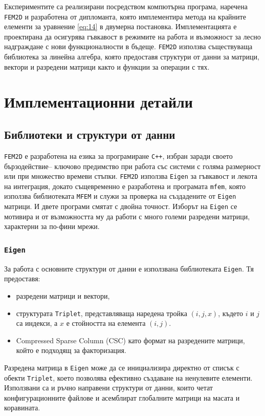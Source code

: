 \documentclass{report}
\begin{document}
	Експериментите са реализирани посредством компютърна програма, наречена \texttt{FEM2D} и разработена от дипломанта, която имплементира метода на крайните елементи за уравнение \eqref{eq:14} в двумерна постановка. Имплементацията е проектирана да осигурява гъвкавост в режимите на работа и възможност за лесно надграждане с нови функционалности в бъдеще. \texttt{FEM2D} използва съществуваща библиотека за линейна алгебра, която предоставя структури от данни за матрици, вектори и разредени матрици както и функции за операции с тях.
	
	
	\section{Имплементационни детайли}
	\subsection{Библиотеки и структури от данни}\label{subsec:libraries}
	\texttt{FEM2D} е разработена на езика за програмиране \texttt{C++}, избран заради своето бързодействие– ключово предимство при работа със системи с голяма размерност или при множество времеви стъпки. \texttt{FEM2D} използва \texttt{Eigen} \cite{eigenweb} за гъвкавост и лекота на интеграция, докато същевременно е разработена и програмата \texttt{mfem}, която използва библиотеката \texttt{MFEM} \cite{mfem2021} и служи за проверка на създадените от \texttt{Eigen} матрици. И двете програми смятат с двойна точност. Изборът на \texttt{Eigen} се мотивира и от възможността му да работи с много големи разредени матрици, характерни за по-фини мрежи.
	
	\subsubsection*{\texttt{Eigen}}
	За работа с основните структури от данни е използвана библиотеката \texttt{Eigen}. Тя предоставя:
	\begin{itemize}
		\item разредени матрици и вектори, 
		\item структурата \texttt{Triplet}, представляваща наредена тройка $(i,j,x)$, където $i$ и $j$ са индекси, а $x$ е стойността на елемента $(i,j)$. 
		\item Compressed Sparse Column (CSC) като формат на разредените матрици, който е подходящ за факторизация.
	\end{itemize}
	Разредена матрица в \texttt{Eigen} може да се инициализира директно от списък с обекти \texttt{Triplet}, което позволява ефективно създаване на ненулевите елементи. Използвани са и ръчно направени структури от данни, които четат конфигурационните файлове и асемблират глобалните матрици на масата и коравината.
	
\end{document}

